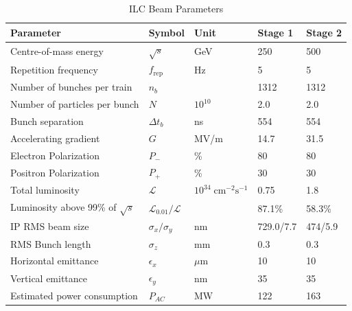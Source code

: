 \begin{table}
\caption[ILC Beam Parameters]{ILC Beam Parameters}
\label{table:ilcbeamparameters}
\centering
\begin{tabular}{l l l l l }
\toprule
\textbf{Parameter}                  & \textbf{Symbol}         & \textbf{Unit}& \textbf{Stage 1} & \textbf{Stage 2} \\
\midrule
Centre-of-mass energy               & $\sqrt{s}$                &GeV                                        & 250 & 500 \\
Repetition frequency                & $f_{\text{rep}}$        &Hz                                         & 5 & 5 \\
Number of bunches per train         & $n_{b}$                 &                                           & 1312 & 1312 \\
Number of particles per bunch                    & $N$                     &$10^{10}$                      & 2.0 & 2.0 \\
Bunch separation                    & $\Delta t_b$             &ns                                         & 554 & 554 \\
\midrule
Accelerating gradient               & $G$                     &MV/m                                       & 14.7 & 31.5 \\
Electron Polarization               & $P_-$                   &\%                                       & 80 & 80 \\
Positron Polarization               & $P_+$                   &\%                                       & 30 & 30 \\
\midrule
Total luminosity                    & $\mathcal{L}$           &$10^{34}\;\text{cm}^{-2}\text{s}^{-1}$     & 0.75 & 1.8 \\
Luminosity above 99\% of $\sqrt{s}$   & $\mathcal{L}_{0.01}/\mathcal{L}$    &                            & 87.1\% & 58.3\% \\
\midrule
IP RMS beam size                    & $\sigma_x/\sigma_y$     &nm                                         & 729.0/7.7 & 474/5.9 \\
RMS Bunch length                    & $\sigma_z$              &mm                                  & 0.3 & 0.3 \\
Horizontal emittance                & $\epsilon_x$            &$\mu$m                                     & 10  & 10 \\
Vertical emittance                  & $\epsilon_y$            &nm                                         & 35 & 35 \\
Estimated power consumption         & $P_{AC}$                &MW                                & 122    & 163   \\
\bottomrule
\end{tabular}
\end{table}

